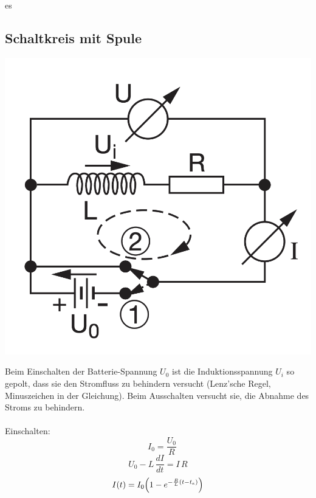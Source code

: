 es\documentclass[a4paper, fontsize=8pt, landscape]{scrartcl}
\begin{document}
\begin{multicols*}{4}
\subsection{Schaltkreis mit Spule}
    \begin{center}
        \includegraphics[scale=0.2]{Images/Schaltkreissmitspule.png}
    \end{center}
    Beim Einschalten der Batterie-Spannung $U_0$ ist die Induktionsspannung $U_i$ so gepolt, dass sie den Stromfluss zu behindern versucht (Lenz’sche Regel, Minuszeichen in der Gleichung). Beim Ausschalten versucht sie, die Abnahme des Stroms zu behindern.\\\\
    Einschalten:
    \[\quad I_0 = \frac{U_0}{R}\]
    \[U_0 - L\,\frac{dI}{dt} = I\,R\]
    \[I(t) = I_0\Bigl(1 - e^{-\frac{R}{L}(t - t_e)}\Bigr)\]\\
    

\end{multicols*}
\end{document}
